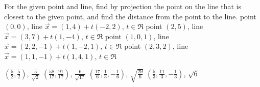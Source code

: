 
\begin{Exercise}[
name={},
title={}, 
difficulty=0,
origin={\cite{SM}}]
For the given point and line, find by projection the point on the line that is closest to the given point, and find the distance from the point to the line.
\Question point $(0,0)$, line $\vec{x}=(1,4)+t(-2,2)$, $t\in\Re$
\Question point $(2,5)$, line $\vec{x}=(3,7)+t(1,-4)$, $t\in\Re$
\Question point $(1,0,1)$, line $\vec{x}=(2,2,-1)+t(1,-2,1)$, $t\in\Re$
\Question point $(2,3,2)$, line $\vec{x}=(1,1,-1)+t(1,4,1)$, $t\in\Re$
\end{Exercise}

\begin{Answer}
\begin{multicols}{2}
\Question $\left(\frac{5}{2},\frac{5}{2}\right)$, $\frac{5}{\sqrt{2}}$
\Question $\left(\frac{58}{17},\frac{91}{17}\right)$, $\frac{6}{\sqrt{17}}$
\Question $\left(\frac{17}{6},\frac{1}{3},-\frac{1}{6}\right)$, $\sqrt{\frac{29}{6}}$
\Question $\left(\frac{5}{3},\frac{11}{3},-\frac{1}{3}\right)$, $\sqrt{6}$
\EndCurrentQuestion
\end{multicols}
\end{Answer}
